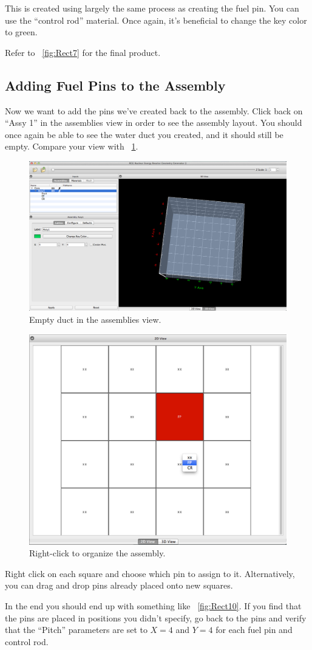 This is created using largely the same process as creating the fuel pin.  You can use the ``control rod'' material.  Once again, it's beneficial to change the key color to green.

Refer to ~\ref{fig:Rect7} for the final product.
\clearpage
\subsection{Adding Fuel Pins to the Assembly}

Now we want to add the pins we've created back to the assembly.  Click back on ``Assy 1'' in the assemblies view in order to see the assembly layout.  You should once again be able to see the water duct you created, and it should still be empty.  Compare your view with ~\ref{fig:Rect8}.

\begin{figure}[htb]
\begin{center}
\includegraphics[width=0.4\linewidth]{Images/rect-empty-assy.png}
\caption{Empty duct in the assemblies view.}
\label{fig:Rect8}
\end{center}
\end{figure}

\begin{figure}[htb]
\begin{center}
\includegraphics[width=0.4\linewidth]{Images/rect-assign-pin.png}
\caption{Right-click to organize the assembly.}
\label{fig:Rect9}
\end{center}
\end{figure}
Right click on each square and choose which pin to assign to it.  Alternatively, you can drag and drop pins already placed onto new squares.

In the end you should end up with something like ~\ref{fig:Rect10}.  If you find that the pins are placed in positions you didn't specify, go back to the pins and verify that the ``Pitch'' parameters are set to $X=4$ and $Y=4$ for each fuel pin and control rod.

